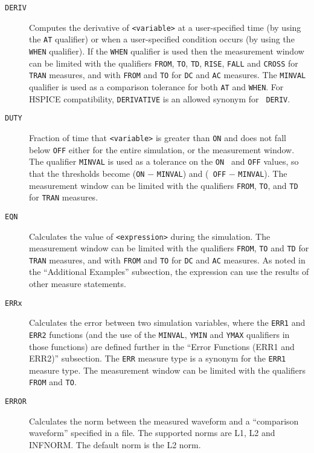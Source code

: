 \begin{Command}
\begin{Arguments}
\begin{description}
  \item[\tt DERIV] Computes the derivative of {\tt <variable>} at a
    user-specified time (by using the {\tt AT} qualifier) or when a
    user-specified condition occurs (by using the {\tt WHEN}
    qualifier). If the {\tt WHEN} qualifier is used then the
    measurement window can be limited with the qualifiers {\tt FROM},
    {\tt TO}, {\tt TD}, {\tt RISE}, {\tt FALL} and {\tt CROSS} for
    {\tt TRAN} measures, and with {\tt FROM} and {\tt TO} for {\tt DC}
    and {\tt AC} measures. The {\tt MINVAL} qualifier is used as a
    comparison tolerance for both {\tt AT} and {\tt WHEN}.  For HSPICE
    compatibility, {\tt DERIVATIVE} is an allowed synonym for {\tt
    DERIV}.

  \item[\tt DUTY] Fraction of time that {\tt <variable>} is greater than
   {\tt ON} and does not fall below {\tt OFF} either for the entire
    simulation, or the measurement window. The qualifier {\tt MINVAL}
    is used as a tolerance on the {\tt ON } and {\tt OFF} values, so
    that the thresholds become ({\tt ON} $-$ {\tt MINVAL}) and ({\tt
    OFF} $-$ {\tt MINVAL}).  The measurement window can be limited
    with the qualifiers {\tt FROM}, {\tt TO}, and {\tt TD} for
   {\tt TRAN} measures.

\item[\tt EQN] Calculates the value of {\tt <expression>} during the simulation.
    The measurement window can be limited with the qualifiers {\tt FROM},
    {\tt TO} and {\tt TD} for {\tt TRAN} measures, and with {\tt FROM}
    and {\tt TO} for {\tt DC} and {\tt AC} measures.  As noted in the
    ``Additional Examples'' subsection, the expression can use the
    results of other measure statements.

\item[\tt ERRx] Calculates the error between two simulation variables, where
    the {\tt ERR1} and {\tt ERR2} functions (and the use of the {\tt MINVAL},
    {\tt YMIN} and {\tt YMAX} qualifiers in those functions) are defined further
    in the ``Error Functions (ERR1 and ERR2)'' subsection.  The {\tt ERR} measure
    type is a synonym for  the {\tt ERR1} measure type.  The measurement
    window can be limited  with the qualifiers {\tt FROM} and {\tt TO}.

  \item[\tt ERROR] Calculates the norm between the measured waveform and a
   ``comparison waveform'' specified in a file.  The supported norms are
    L1, L2 and INFNORM.  The default norm is the L2 norm.


\end{description}
\end{Arguments}
\end{Command}
